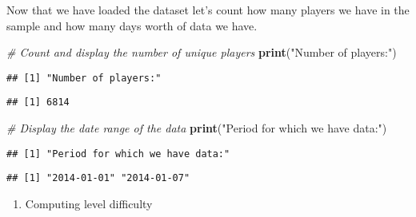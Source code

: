 \documentclass[
]{article}
\newenvironment{Shaded}{\begin{snugshade}}{\end{snugshade}}
\newcommand{\CommentTok}[1]{\textcolor[rgb]{0.56,0.35,0.01}{\textit{#1}}}
\newcommand{\FunctionTok}[1]{\textcolor[rgb]{0.13,0.29,0.53}{\textbf{#1}}}
\newcommand{\NormalTok}[1]{#1}
\newcommand{\SpecialCharTok}[1]{\textcolor[rgb]{0.81,0.36,0.00}{\textbf{#1}}}
\newcommand{\StringTok}[1]{\textcolor[rgb]{0.31,0.60,0.02}{#1}}
\providecommand{\tightlist}{%
  \setlength{\itemsep}{0pt}\setlength{\parskip}{0pt}}
\begin{document}
Now that we have loaded the dataset let's count how many players we have
in the sample and how many days worth of data we have.

\begin{Shaded}
\begin{Highlighting}[]
\CommentTok{\# Count and display the number of unique players}
\FunctionTok{print}\NormalTok{(}\StringTok{"Number of players:"}\NormalTok{)}
\end{Highlighting}
\end{Shaded}

\begin{verbatim}
## [1] "Number of players:"
\end{verbatim}

\begin{Shaded}
\end{Shaded}

\begin{verbatim}
## [1] 6814
\end{verbatim}

\begin{Shaded}
\begin{Highlighting}[]
\CommentTok{\# Display the date range of the data}
\FunctionTok{print}\NormalTok{(}\StringTok{"Period for which we have data:"}\NormalTok{)}
\end{Highlighting}
\end{Shaded}

\begin{verbatim}
## [1] "Period for which we have data:"
\end{verbatim}

\begin{Shaded}
\end{Shaded}

\begin{verbatim}
## [1] "2014-01-01" "2014-01-07"
\end{verbatim}

\begin{enumerate}
\def\labelenumi{\arabic{enumi}.}
\setcounter{enumi}{3}
\tightlist
\item
  Computing level difficulty
\end{enumerate}
\end{document}
